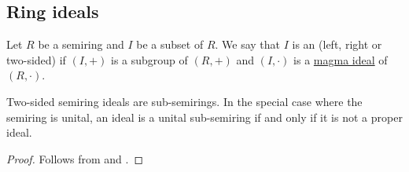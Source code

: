 \subsection{Ring ideals}\label{subsec:ring_ideals}

\begin{definition}\label{def:semiring_ideal}
  Let \( R \) be a semiring and \( I \) be a subset of \( R \). We say that \( I \) is an  (left, right or two-sided) if \( (I, +) \) is a subgroup of \( (R, +) \) and \( (I, \cdot) \) is a \hyperref[def:magma_ideal]{magma ideal} of \( (R, \cdot) \).
\end{definition}

\begin{proposition}\label{thm:semiring_ideal_is_nonunital_sub-semiring}
  Two-sided semiring ideals are sub-semirings. In the special case where the semiring is unital, an ideal is a unital sub-semiring if and only if it is not a proper ideal.
\end{proposition}
\begin{proof}
  Follows from  and .
\end{proof}

